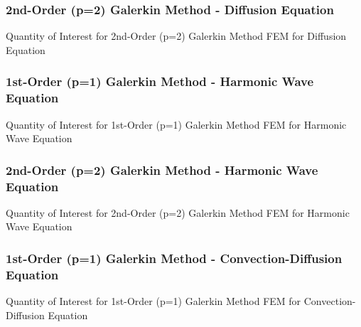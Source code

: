\documentclass[10pt]{article}		%
\numberwithin{equation}{section}
\begin{document}
\newpage

\subsubsection{2nd-Order (p=2) Galerkin Method - Diffusion Equation}

\begin{table}[H]
	\caption{Quantity of Interest for  2nd-Order (p=2) Galerkin Method FEM for Diffusion Equation}	
\end{table}

\newpage

\subsubsection{1st-Order (p=1) Galerkin Method - Harmonic Wave Equation}

\begin{table}[H]
	\caption{Quantity of Interest for  1st-Order (p=1) Galerkin Method FEM for Harmonic Wave Equation}	
	
	
\end{table}

\newpage

\subsubsection{2nd-Order (p=2) Galerkin Method - Harmonic Wave Equation}

\begin{table}[H]
	\caption{Quantity of Interest for  2nd-Order (p=2) Galerkin Method FEM for Harmonic Wave Equation}	
\end{table}

\newpage

\subsubsection{1st-Order (p=1) Galerkin Method - Convection-Diffusion Equation}

\begin{table}[H]
	\caption{Quantity of Interest for  1st-Order (p=1) Galerkin Method FEM for Convection-Diffusion Equation}	
	
	
\end{table}
\end{document}
